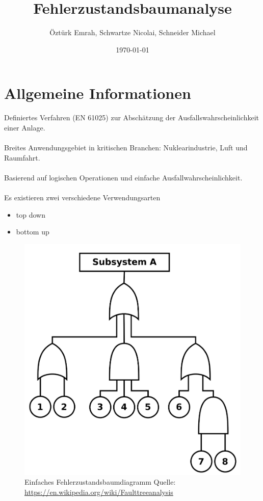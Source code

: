 \documentclass{beamer}
\title{Fehlerzustandsbaumanalyse}
\author{Öztürk Emrah, Schwartze Nicolai, Schneider Michael}
\date{\today}
\begin{document}
\maketitle

\section{Allgemeine Informationen}
\frame{\tableofcontents[currentsection]}
\begin{frame}
	Definiertes Verfahren (EN 61025) zur Abschätzung der Ausfallswahrscheinlichkeit einer Anlage.\\~\\
	Breites Anwendungsgebiet in kritischen Branchen: Nuklearindustrie, Luft und Raumfahrt.\\~\\
	Basierend auf logischen Operationen und einfache Ausfallwahrscheinlichkeit.\\~\\
	Es existieren zwei verschiedene Verwendungsarten
	\begin{itemize}
		\item top down
		\item bottom up
	\end{itemize}
\end{frame}

\begin{frame}
\begin{figure}
	\centering
	\includegraphics[width=0.6\linewidth]{fault_tree_example}
	\caption{Einfaches Fehlerzustandsbaumdiagramm Quelle: \href{https://en.wikipedia.org/wiki/Fault_tree_analysis}{https://en.wikipedia.org/wiki/Fault\textunderscore tree\textunderscore analysis}}
	\label{fig:faulttreeexample}
\end{figure}
\end{frame}
\end{document}
